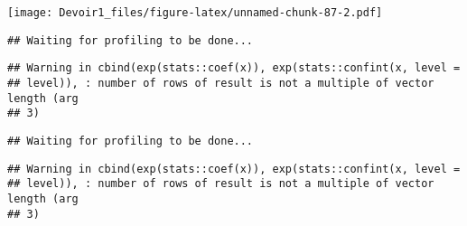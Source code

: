 \documentclass[]{article}
\newenvironment{Shaded}{\begin{snugshade}}{\end{snugshade}}
\newcommand{\KeywordTok}[1]{\textcolor[rgb]{0.13,0.29,0.53}{\textbf{#1}}}
\newcommand{\DataTypeTok}[1]{\textcolor[rgb]{0.13,0.29,0.53}{#1}}
\newcommand{\DecValTok}[1]{\textcolor[rgb]{0.00,0.00,0.81}{#1}}
\newcommand{\StringTok}[1]{\textcolor[rgb]{0.31,0.60,0.02}{#1}}
\newcommand{\OperatorTok}[1]{\textcolor[rgb]{0.81,0.36,0.00}{\textbf{#1}}}
\newcommand{\NormalTok}[1]{#1}
\begin{document}
\texttt{[image: Devoir1\_files/figure-latex/unnamed-chunk-87-2.pdf]}

\begin{Shaded}
\end{Shaded}

\begin{verbatim}
## Waiting for profiling to be done...
\end{verbatim}

\begin{verbatim}
## Warning in cbind(exp(stats::coef(x)), exp(stats::confint(x, level =
## level)), : number of rows of result is not a multiple of vector length (arg
## 3)
\end{verbatim}

\begin{verbatim}
## Waiting for profiling to be done...
\end{verbatim}

\begin{verbatim}
## Warning in cbind(exp(stats::coef(x)), exp(stats::confint(x, level =
## level)), : number of rows of result is not a multiple of vector length (arg
## 3)
\end{verbatim}
\end{document}
